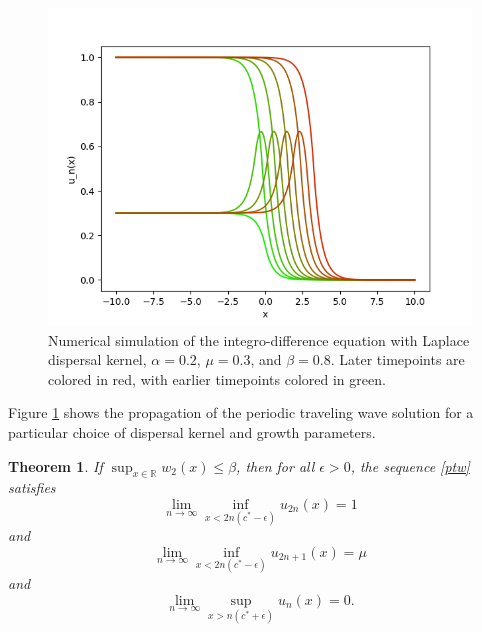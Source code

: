 \documentclass[11pt]{article}
\newtheorem{thm}{Theorem}
\theoremstyle{definition}
\numberwithin{equation}{section}
\numberwithin{thm}{section}
\renewcommand{\b}{\beta}
\newcommand{\m}{\mu}
\begin{document}
\begin{figure}[h!] 
\centering
  \caption{Numerical simulation of the integro-difference equation with Laplace dispersal kernel, $\alpha=0.2$, $\mu=0.3$, and $\beta=0.8$. Later timepoints are colored in red, with earlier timepoints colored in green.}
\label{fig3}
  \includegraphics{figures/fig3.png}
\end{figure}

Figure \ref{fig3} shows the propagation of the periodic traveling wave solution for a particular choice of dispersal kernel and growth parameters.


\begin{thm}  \label{theorem2}
If $\sup_{x\in\mathbb R}w_2(x)\leq \b$, then for all $\epsilon>0$, the sequence \ref{ptw} satisfies
\begin{equation}
\lim_{n\to\infty}\inf_{x<2n(c^*-\epsilon)}u_{2n}(x)=1
\end{equation}
and
\begin{equation}
\lim_{n\to\infty}\inf_{x<2n(c^*-\epsilon)}u_{2n+1}(x)=\m
\end{equation}
and 
\begin{equation}
\lim_{n\to\infty}\sup_{x>n(c^*+\epsilon)}u_n(x)=0.
\end{equation}
\end{thm}
\end{document}
